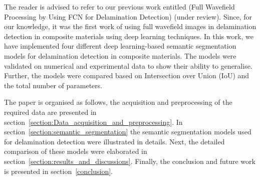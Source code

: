 The reader is advised to refer to our previous work entitled (Full Wavefield Processing by Using FCN for Delamination Detection) (under review). Since, for our knowledge, it was the first work of using full wavefield images in delamination detection in composite materials using deep learning techniques. 
In this work, we have implemented four different deep learning-based semantic segmentation models for delamination detection in composite materials.
The models were validated on numerical and experimental data to show their ability to generalise.
Further, the models were compared based on Intersection over Union (IoU) and the total number of parameters.

The paper is organised as follows, the acquisition and preprocessing of the required data are presented in section~\ref{section:Data_acquisition_and_preprocessing}.
In section~\ref{section:semantic_segmentation} the semantic segmentation models used for delamination detection were illustrated in details. 
Next, the detailed comparison of these models were elaborated in section~\ref{section:results_and_discussions}.
Finally, the conclusion and future work is presented in section~\ref{conclusion}.